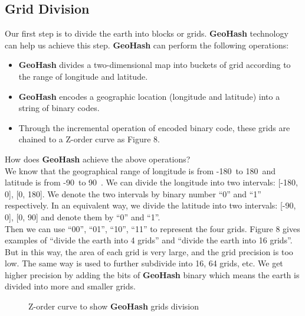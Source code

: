 \documentclass[sigplan,screen]{acmart}
\begin{document}
\subsection{Grid Division}
Our first step is to divide the earth into blocks or grids. \textbf{GeoHash} technology can help us achieve this step.
\textbf{GeoHash} can perform the following operations:
\begin{itemize}
	\item \textbf{GeoHash} divides a two-dimensional map into buckets of grid according to the range of longitude and latitude.
	\item \textbf{GeoHash} encodes a geographic location (longitude and latitude) into a string of binary codes.
	\item Through the incremental operation of encoded binary code, these grids are chained to a Z-order curve as Figure 8.
\end{itemize}
How does \textbf{GeoHash} achieve the above operations?
\\
We know that the geographical range of longitude is from -180\degree\ to 180\degree\ and latitude is from -90\degree\ to 90\degree\ \cite{crossley1999guide}.
We can divide the longitude into two intervals: [-180\degree, 0\degree], [0\degree, 180\degree].
We denote the two intervals by binary number ``0'' and ``1'' respectively.
In an equivalent way, we divide the latitude into two intervals: [-90\degree, 0\degree], [0\degree, 90\degree] and denote them by ``0'' and ``1''.
\\
Then we can use ``00'', ``01'', ``10'', ``11'' to represent the four grids.
Figure 8 gives examples of ``divide the earth into 4 grids'' and ``divide the earth into 16 grids''.
But in this way, the area of each grid is very large, and the grid precision is too low.
The same way is used to further subdivide into 16, 64 grids, etc.
We get higher precision by adding the bits of \textbf{GeoHash} binary which means the earth is divided into more and smaller grids.
\begin{figure}[htb]
	\centering
	\caption{Z-order curve to show \textbf{GeoHash} grids division}
\end{figure}
\end{document}
